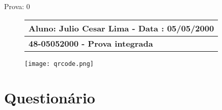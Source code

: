 \documentclass[addpoints,answers]{exam}%
\begin{document}
%
\normalsize%
\ID Prova: {0}%


\begin{figure}[htbp]%
\centering%
\begin{tabular}{p{5.5in}}%
\textbf{Aluno: Julio Cesar Lima {-} Data : 05/05/2000}\\%
\hline%
\textbf{48{-}05052000 {-} Prova integrada}\\%
\end{tabular}%
\begin{minipage}{1\textwidth}%
\texttt{[image: qrcode.png]}%
\label{fig:qrcode}%
\end{minipage}%
\end{figure}

%
\centering%
\section*{Questionário}%
\label{sec:Questionrio}%
\end{document}
